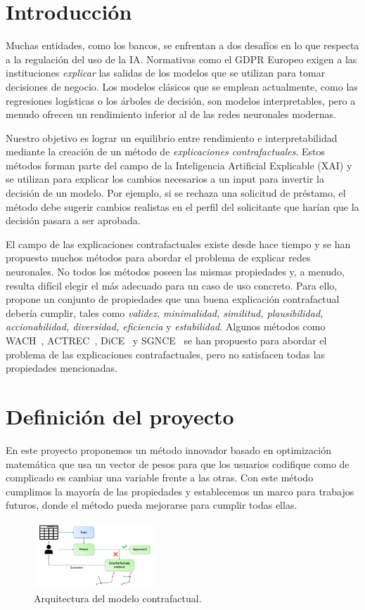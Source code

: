 \documentclass[12pt]{extarticle}
\numberwithin{equation}{section}
\begin{document}
\section*{Introducción}
Muchas entidades, como los bancos, se enfrentan a dos desafíos en lo que respecta a la regulación del uso de la IA. Normativas como el GDPR Europeo exigen a las instituciones \emph{explicar} las salidas de los modelos que se utilizan para tomar decisiones de negocio. Los modelos clásicos que se emplean actualmente, como las regresiones logísticas o los árboles de decisión, son modelos interpretables, pero a menudo ofrecen un rendimiento inferior al de las redes neuronales modernas.

Nuestro objetivo es lograr un equilibrio entre rendimiento e interpretabilidad mediante la creación de un método de \emph{explicaciones contrafactuales}. Estos métodos forman parte del campo de la Inteligencia Artificial Explicable (XAI) y se utilizan para explicar los cambios necesarios a un input para invertir la decisión de un modelo. Por ejemplo, si se rechaza una solicitud de préstamo, el método debe sugerir cambios realistas en el perfil del solicitante que harían que la decisión pasara a ser aprobada.

El campo de las explicaciones contrafactuales existe desde hace tiempo y se han propuesto muchos métodos para abordar el problema de explicar redes neuronales. No todos los métodos poseen las mismas propiedades y, a menudo, resulta difícil elegir el más adecuado para un caso de uso concreto. Para ello, \cite{guidotti2024counterfactual_res} propone un conjunto de propiedades que una buena explicación contrafactual debería cumplir, tales como \emph{validez, minimalidad, similitud, plausibilidad, accionabilidad, diversidad, eficiencia} y \emph{estabilidad}. Algunos métodos como WACH~\cite{wachter2017counterfactual_res}, ACTREC~\cite{ustun2019actionable_res}, DiCE~\cite{dice_res} y SGNCE~\cite{sgnce_res} se han propuesto para abordar el problema de las explicaciones contrafactuales, pero no satisfacen todas las propiedades mencionadas.

\section*{Definición del proyecto}
En este proyecto proponemos un método innovador basado en optimización matemática que usa un vector de pesos para que los usuarios codifique como de complicado es cambiar una variable frente a las otras. Con este método cumplimos la mayoría de las propiedades y establecemos un marco para trabajos futuros, donde el método pueda mejorarse para cumplir todas ellas.
\begin{figure}[H]
\centering
\includegraphics[width=0.4\textwidth]{images/diagram}
\caption{Arquitectura del modelo contrafactual.}
\end{figure}
\end{document}
